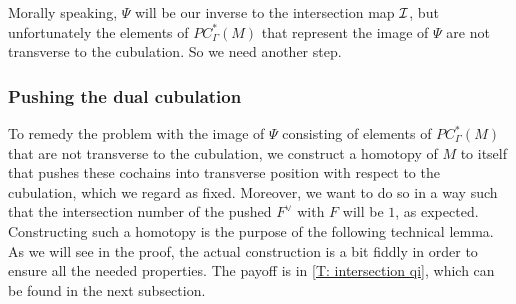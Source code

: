 Morally speaking, $\Psi$ will be our inverse to the intersection map $\mathcal{I}$, but unfortunately the elements of $PC^*_\Gamma(M)$ that represent the image of $\Psi$ are not transverse to the cubulation. So we need another step.

\subsubsection{Pushing the dual cubulation}

To remedy the problem with the image of $\Psi$ consisting of elements of $PC^*_\Gamma(M)$ that are not transverse to the cubulation, we construct a homotopy of $M$ to itself that pushes these cochains into transverse position with respect to the cubulation, which we regard as fixed. Moreover, we want to do so in a way such that the intersection number of the pushed $F^\vee$ with $F$ will be $1$, as expected. Constructing such a homotopy is the purpose of the following technical lemma. As we will see in the proof, the actual construction is a bit fiddly in order to ensure all the needed properties. The payoff is in \cref{T: intersection qi}, which can be found in the next subsection. 


